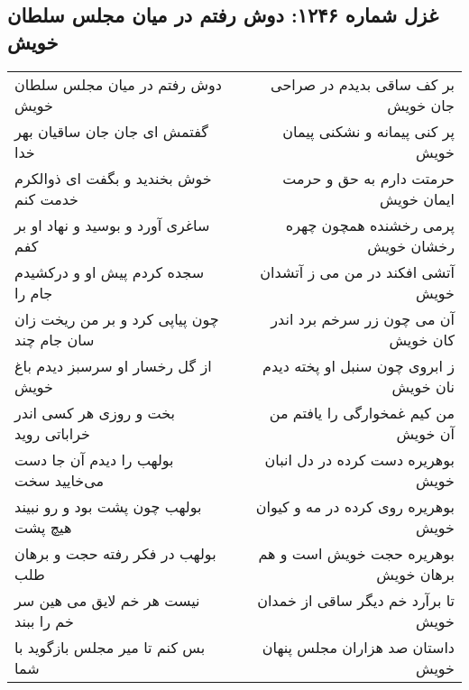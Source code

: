 \begin{center}
\section*{غزل شماره ۱۲۴۶: دوش رفتم در میان مجلس سلطان خویش}
\label{sec:1246}
\begin{longtable}{l p{0.5cm} r}
دوش رفتم در میان مجلس سلطان خویش
&&
بر کف ساقی بدیدم در صراحی جان خویش
\\
گفتمش ای جان جان ساقیان بهر خدا
&&
پر کنی پیمانه و نشکنی پیمان خویش
\\
خوش بخندید و بگفت ای ذوالکرم خدمت کنم
&&
حرمتت دارم به حق و حرمت ایمان خویش
\\
ساغری آورد و بوسید و نهاد او بر کفم
&&
پرمی رخشنده همچون چهره رخشان خویش
\\
سجده کردم پیش او و درکشیدم جام را
&&
آتشی افکند در من می ز آتشدان خویش
\\
چون پیاپی کرد و بر من ریخت زان سان جام چند
&&
آن می چون زر سرخم برد اندر کان خویش
\\
از گل رخسار او سرسبز دیدم باغ خویش
&&
ز ابروی چون سنبل او پخته دیدم نان خویش
\\
بخت و روزی هر کسی اندر خراباتی روید
&&
من کیم غمخوارگی را یافتم من آن خویش
\\
بولهب را دیدم آن جا دست می‌خایید سخت
&&
بوهریره دست کرده در دل انبان خویش
\\
بولهب چون پشت بود و رو نبیند هیچ پشت
&&
بوهریره روی کرده در مه و کیوان خویش
\\
بولهب در فکر رفته حجت و برهان طلب
&&
بوهریره حجت خویش است و هم برهان خویش
\\
نیست هر خم لایق می هین سر خم را ببند
&&
تا برآرد خم دیگر ساقی از خمدان خویش
\\
بس کنم تا میر مجلس بازگوید با شما
&&
داستان صد هزاران مجلس پنهان خویش
\\
\end{longtable}
\end{center}
